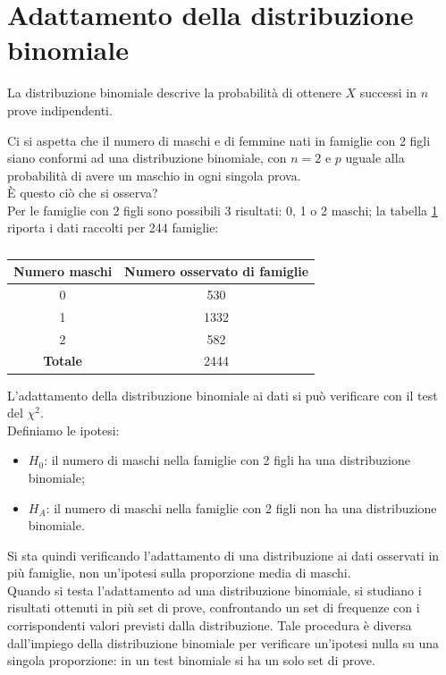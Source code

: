 \documentclass[10pt, draft]{book}
\newcounter{example}[section]
\begin{document}
\section{Adattamento della distribuzione binomiale}

La distribuzione binomiale descrive la probabilità di ottenere $X$ successi in $n$ prove indipendenti.

\begin{example}
Ci si aspetta che il numero di maschi e di femmine nati in famiglie con 2 figli siano conformi ad una distribuzione binomiale, con $n =2$ e $p$ uguale alla probabilità di avere un maschio in ogni singola prova.
\\
È questo ciò che si osserva?
\\
Per le famiglie con 2 figli sono possibili 3 risultati: 0, 1 o 2 maschi; la tabella \ref{tabmaschi} riporta i dati raccolti per 244 famiglie:
    \begin{table}[H]
        \centering
        \renewcommand\arraystretch{1.2}
        \begin{tabular}{c|c}
        \hline
        \textbf{Numero maschi} & \textbf{Numero osservato di famiglie} \\
        \hline
        0 & 530 \\
        1 & 1332 \\
        2 & 582 \\
        \hline
        \textbf{Totale} & 2444 \\
        \hline
        \end{tabular}
        \caption{}
        \label{tabmaschi}
    \end{table}\noindent
    L'adattamento della distribuzione binomiale ai dati si può verificare con il test del $\chi^2$.
    \\
Definiamo le ipotesi:
    \begin{itemize}
    \item $H_0$: il numero di maschi nella famiglie con 2 figli ha una distribuzione binomiale;
    \item $H_A$: il numero di maschi nella famiglie con 2 figli non ha una distribuzione binomiale.
    \end{itemize}
    Si sta quindi verificando l'adattamento di una distribuzione ai dati osservati in più famiglie, non un'ipotesi sulla proporzione media di maschi.
    \\
    Quando si testa l'adattamento ad una distribuzione binomiale, si studiano i risultati ottenuti in più set di prove, confrontando un set di frequenze con i corrispondenti valori previsti dalla distribuzione. Tale procedura è diversa dall'impiego della distribuzione binomiale per verificare un'ipotesi nulla su una singola proporzione: in un test binomiale si ha un solo set di prove.

\end{example}
\end{document}
